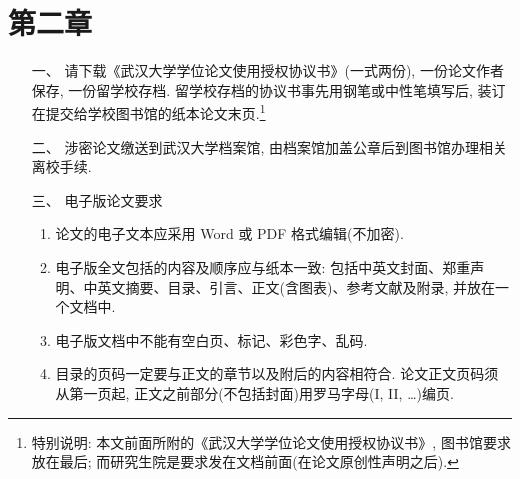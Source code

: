 
\chapter{第二章}


\begin{itemize}
  \item[一、] 请下载《武汉大学学位论文使用授权协议书》(一式两份), 一份论文作者保存, 一份留学校存档.
    留学校存档的协议书事先用钢笔或中性笔填写后,  装订在提交给学校图书馆的纸本论文末页.\footnote{\heiti 特别说明:
    本文前面所附的《武汉大学学位论文使用授权协议书》, 图书馆要求放在最后;
    而研究生院是要求发在文档前面(在论文原创性声明之后). }

    \item[二、]涉密论文缴送到武汉大学档案馆, 由档案馆加盖公章后到图书馆办理相关离校手续.

    \item[三、]电子版论文要求
    

\begin{enumerate}[1.]

  \item 论文的电子文本应采用 Word 或 PDF 格式编辑(不加密).
  \item 电子版全文包括的内容及顺序应与纸本一致: 包括中英文封面、郑重声明、中英文摘要、目录、引言、正文(含图表)、参考文献及附录, 并放在一个文档中.
  \item 电子版文档中不能有空白页、标记、彩色字、乱码.
  \item 目录的页码一定要与正文的章节以及附后的内容相符合. 论文正文页码须从第一页起, 正文之前部分(不包括封面)用罗马字母(I, II, \dots)编页.
\end{enumerate}
\end{itemize}





